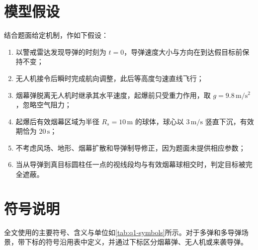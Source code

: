 \section{模型假设}

结合题面给定机制，作如下假设：
\begin{enumerate}
    \item 以警戒雷达发现导弹的时刻为 $t=0$，导弹速度大小与方向在到达假目标前保持不变；
    \item 无人机接令后瞬时完成航向调整，此后等高度匀速直线飞行；
    \item 烟幕弹脱离无人机时继承其水平速度，起爆前只受重力作用，取 $g=9.8\,\mathrm{m/s^2}$，忽略空气阻力；
    \item 起爆后有效烟幕区域为半径 $R_s=10\,\mathrm{m}$ 的球体，球心以 $3\,\mathrm{m/s}$ 竖直下沉，有效期恰为 $20\,\mathrm{s}$；
    \item 不考虑风场、地形、烟幕扩散和导弹制导修正，因为题面未提供相应参数；
    \item 当从导弹到真目标圆柱任一点的视线段均与有效烟幕球相交时，判定目标被完全遮蔽。
\end{enumerate}

\section{符号说明}

全文使用的主要符号、含义与单位如\cref{tab:q1-symbols}所示。对于多弹和多导弹场景，带下标的符号沿用表中定义，并通过下标区分烟幕弹、无人机或来袭导弹。

